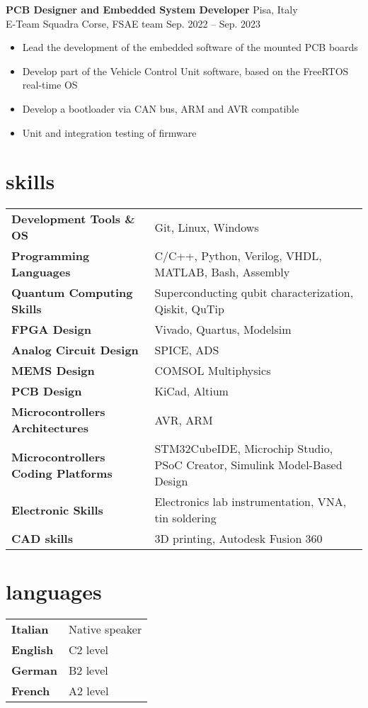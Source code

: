 \documentclass[10pt]{article}
\newcommand{\entry}[4]{{{\textbf{#1}}} \hfill #3 \\ #2 \hfill #4}
\begin{document}
\smallskip

\entry{PCB Designer and Embedded System Developer}{E-Team Squadra Corse, FSAE team}{Pisa, Italy}{Sep. 2022 -- Sep. 2023}
\begin{itemize}[noitemsep,leftmargin=3.5mm,rightmargin=0mm,topsep=6pt]
    \item Lead the development of the embedded software of the mounted PCB boards
    \item Develop part of the Vehicle Control Unit software, based on the FreeRTOS real-time OS
    \item Develop a bootloader via CAN bus, ARM and AVR compatible
    \item Unit and integration testing of firmware
\end{itemize}

\section{skills}
\begin{tabular}{l l}
    \textbf{Development Tools \& OS}& Git, Linux, Windows\\
    \textbf{Programming Languages}& C/C++, Python, Verilog, VHDL, MATLAB, Bash, Assembly\\
    \textbf{Quantum Computing Skills}& Superconducting qubit characterization, Qiskit, QuTip\\
    \textbf{FPGA Design}& Vivado, Quartus, Modelsim\\
    \textbf{Analog Circuit Design}& SPICE, ADS\\
    \textbf{MEMS Design}& COMSOL Multiphysics\\
    \textbf{PCB Design}& KiCad, Altium\\
    \textbf{Microcontrollers Architectures}& AVR, ARM\\
    \textbf{Microcontrollers Coding Platforms}& STM32CubeIDE, Microchip Studio, PSoC Creator, Simulink Model-Based Design\\
    \textbf{Electronic Skills}& Electronics lab instrumentation, VNA, tin soldering\\
    \textbf{CAD skills}& 3D printing, Autodesk Fusion 360
\end{tabular}

\section{languages}
\begin{tabular}{l l}
    \textbf{Italian}& Native speaker\\
    \textbf{English}& C2 level\\
    \textbf{German}& B2 level\\
    \textbf{French}& A2 level
\end{tabular}
\end{document}
